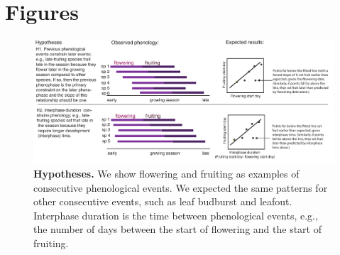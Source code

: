 \documentclass{article}
\begin{document}
\section* {Figures}
\begin{figure}[p]
  \centering
  \includegraphics{../analyses/figures/hypotheses3.pdf} 
  \caption{\textbf{Hypotheses.} We show flowering and fruiting as examples of consecutive phenological events. We expected the same patterns for other consecutive events, such as leaf budburst and leafout. Interphase duration is the time between phenological events, e.g., the number of days between the start of flowering and the start of fruiting.} 
 \label{fig:hyp}
\end{figure}
 
\end{document}
